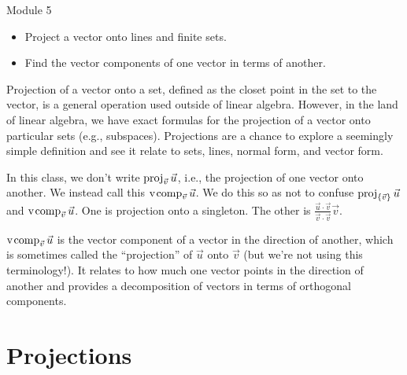 \begin{lesson}

	Module 5

	\begin{itemize}
		\item Project a vector onto lines and finite sets.
		\item Find the vector components of one vector in terms of another.
	\end{itemize}

	Projection of a vector onto a set, defined as the closet point in the
	set to the vector, is a general operation used outside of linear algebra.
	However, in the land of linear algebra, we have exact formulas for the
	projection of a vector onto particular sets (e.g., subspaces).
	Projections are a chance to explore a seemingly simple definition
	and see it relate to sets, lines, normal form, and vector form.

	\begin{annotation}
		\begin{notes}
			In this class, we don't write $\operatorname{proj}_{\vec v}\vec u$,
			i.e., the projection of one vector onto another. We
			instead call this $\operatorname{\operatorname{v\hspace{1pt}comp}}_{\vec v}\vec u$. We do this so
			as not to confuse $\operatorname{proj}_{\{\vec v\}}\vec u$ and
			$\operatorname{\operatorname{v\hspace{1pt}comp}}_{\vec v}\vec u$. One is projection onto a singleton.
			The other is $\frac{\vec u\cdot \vec v}{\vec v\cdot \vec v}\vec v$.
		\end{notes}
	\end{annotation}
	$\operatorname{\operatorname{v\hspace{1pt}comp}}_{\vec v}\vec u$ is the vector component of a vector in the direction of another,
	which is sometimes called the ``projection'' of $\vec u$ onto $\vec v$ (but we're not using
	this terminology!). It relates
	to how much one vector points in the direction of another and
	provides a decomposition of vectors in terms of orthogonal components.


\end{lesson}
	\bookonlynewpage
\section*{Projections}



